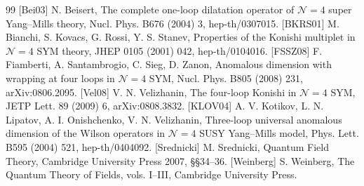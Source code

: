\documentclass[11pt]{article}
\theoremstyle{definition}
\numberwithin{equation}{section}
\begin{document}
\begin{thebibliography}{99}
 [Bei03] N. Beisert, The complete one-loop dilatation operator of $\mathcal N=4$ super Yang--Mills theory, Nucl. Phys. B676 (2004) 3, hep-th/0307015.
 [BKRS01] M. Bianchi, S. Kovacs, G. Rossi, Y. S. Stanev, Properties of the Konishi multiplet in $\mathcal N=4$ SYM theory, JHEP 0105 (2001) 042, hep-th/0104016.
 [FSSZ08] F. Fiamberti, A. Santambrogio, C. Sieg, D. Zanon, Anomalous dimension with wrapping at four loops in $\mathcal N=4$ SYM, Nucl. Phys. B805 (2008) 231, arXiv:0806.2095.
 [Vel08] V. N. Velizhanin, The four-loop Konishi in $\mathcal N=4$ SYM, JETP Lett. 89 (2009) 6, arXiv:0808.3832.
 [KLOV04] A. V. Kotikov, L. N. Lipatov, A. I. Onishchenko, V. N. Velizhanin, Three-loop universal anomalous dimension of the Wilson operators in $\mathcal N=4$ SUSY Yang--Mills model, Phys. Lett. B595 (2004) 521, hep-th/0404092.
 [Srednicki] M. Srednicki, Quantum Field Theory, Cambridge University Press 2007, \S\S34--36.
 [Weinberg] S. Weinberg, The Quantum Theory of Fields, vols. I--III, Cambridge University Press.
\end{thebibliography}
\end{document}
